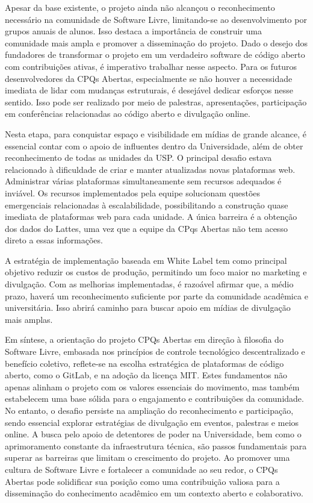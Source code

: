 Apesar da base existente, o projeto ainda não alcançou o reconhecimento necessário na comunidade de Software Livre, limitando-se ao desenvolvimento por grupos anuais de alunos. Isso destaca a importância de construir uma comunidade mais ampla e promover a disseminação do projeto. Dado o desejo dos fundadores de transformar o projeto em um verdadeiro software de código aberto com contribuições ativas, é imperativo trabalhar nesse aspecto. Para os futuros desenvolvedores da CPQs Abertas, especialmente se não houver a necessidade imediata de lidar com mudanças estruturais, é desejável dedicar esforços nesse sentido. Isso pode ser realizado por meio de palestras, apresentações, participação em conferências relacionadas ao código aberto e divulgação online.

Nesta etapa, para conquistar espaço e visibilidade em mídias de grande alcance, é essencial contar com o apoio de influentes dentro da Universidade, além de obter reconhecimento de todas as unidades da USP. O principal desafio estava relacionado à dificuldade de criar e manter atualizadas novas plataformas web. Administrar várias plataformas simultaneamente sem recursos adequados é inviável. Os recursos implementados pela equipe solucionam questões emergenciais relacionadas à escalabilidade, possibilitando a construção quase imediata de plataformas web para cada unidade. A única barreira é a obtenção dos dados do Lattes, uma vez que a equipe da CPqs Abertas não tem acesso direto a essas informações.

A estratégia de implementação baseada em White Label tem como principal objetivo reduzir os custos de produção, permitindo um foco maior no marketing e divulgação. Com as melhorias implementadas, é razoável afirmar que, a médio prazo, haverá um reconhecimento suficiente por parte da comunidade acadêmica e universitária. Isso abrirá caminho para buscar apoio em mídias de divulgação mais amplas.

Em síntese, a orientação do projeto CPQs Abertas em direção à filosofia do Software Livre, embasada nos princípios de controle tecnológico descentralizado e benefício coletivo, reflete-se na escolha estratégica de plataformas de código aberto, como o GitLab, e na adoção da licença MIT. Estes fundamentos não apenas alinham o projeto com os valores essenciais do movimento, mas também estabelecem uma base sólida para o engajamento e contribuições da comunidade. No entanto, o desafio persiste na ampliação do reconhecimento e participação, sendo essencial explorar estratégias de divulgação em eventos, palestras e meios online. A busca pelo apoio de detentores de poder na Universidade, bem como o aprimoramento constante da infraestrutura técnica, são passos fundamentais para superar as barreiras que limitam o crescimento do projeto. Ao promover uma cultura de Software Livre e fortalecer a comunidade ao seu redor, o CPQs Abertas pode solidificar sua posição como uma contribuição valiosa para a disseminação do conhecimento acadêmico em um contexto aberto e colaborativo.